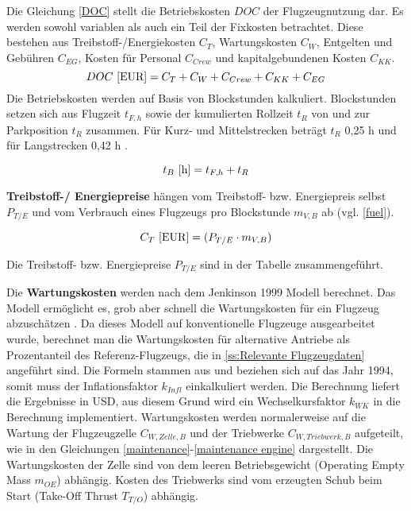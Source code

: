 Die Gleichung \eqref{DOC} stellt die Betriebskosten $DOC$ der Flugzeugnutzung dar. 
Es werden sowohl variablen als auch ein Teil der Fixkosten betrachtet.
Diese bestehen aus Treibstoff-/Energiekosten $C_T$, 
Wartungskosten $C_W$, Entgelten und Gebühren $C_{EG}$, 
Kosten für Personal $C_{Crew}$ und kapitalgebundenen Kosten $C_{KK}$.
%
\begin{equation}
     {DOC ~[\text{EUR}]} = C_T + C_W + C_{Crew} + C_{KK} + C_{EG} \\
     \label{DOC}
  \end{equation}
%
Die Betriebskosten werden auf Basis von Blockstunden kalkuliert. 
Blockstunden setzen sich aus Flugzeit $t_{F,h}$ sowie der kumulierten Rollzeit $t_{R}$ 
von und zur Parkposition $t_{R}$ zusammen. 
Für Kurz- und Mittelstrecken beträgt $t_{R}$ {0,25 h} und für Langstrecken 0,42 h \cite{scholz_design_evaluation_doc}.

\begin{equation}
   t_{B} ~[\text{h}] = t_{F,h} + t_{R} \\
   \label{blockzeit}
\end{equation}

\textbf{Treibstoff-/ Energiepreise} hängen vom Treibstoff- bzw. Energiepreis selbst $P_{T/E}$ 
und vom Verbrauch eines Flugzeugs pro Blockstunde $m_{V,B}$ ab (vgl. \eqref{fuel}).

\begin{equation}
   {C_T ~[\text{EUR}]} = (P_{T/E} \cdot m_{V,B}) \\
   \label{fuel}
\end{equation}

Die Treibstoff- bzw. Energiepreise $P_{T/E}$ sind in der Tabelle zusammengeführt.

Die \textbf{Wartungskosten} werden nach dem Jenkinson 1999 Modell berechnet. 
Das Modell ermöglicht es, grob aber schnell die Wartungskosten 
für ein Flugzeug abzuschätzen \cite{bruge2018wartungskosten}.
Da dieses Modell auf konventionelle Flugzeuge ausgearbeitet wurde, 
berechnet man die Wartungskosten für alternative Antriebe als Prozentanteil des Referenz-Flugzeugs, 
die in \ref{ss:Relevante Flugzeugdaten} angeführt sind.
Die Formeln stammen aus \cite{bruge2018wartungskosten} und beziehen sich auf das Jahr 1994, 
somit muss der Inflationsfaktor $k_{Infl}$ einkalkuliert werden. 
Die Berechnung liefert die Ergebnisse in USD, 
aus diesem Grund wird ein Wechselkursfaktor $k_{WK}$ in die Berechnung implementiert.
Wartungskosten werden normalerweise auf die Wartung der Flugzeugzelle $C_{W,Zelle,B}$ 
und der Triebwerke $C_{W,Triebwerk,B}$ aufgeteilt, 
wie in den Gleichungen \eqref{maintenance}-\eqref{maintenance engine} dargestellt. 
Die Wartungskosten der Zelle sind von dem leeren Betriebsgewicht 
(Operating Empty Mass $m_{OE}$) abhängig. 
Kosten des Triebwerks sind vom erzeugten Schub beim Start (Take-Off Thrust $T_{T/O}$) abhängig.

